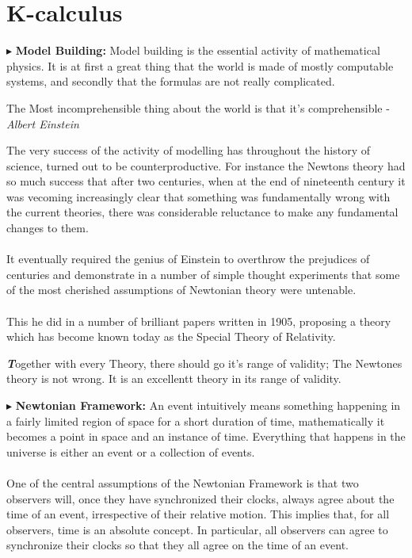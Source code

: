 \documentclass[10pt,a4paper,twocolumn]{article}
\newcounter{theo}
\newenvironment{callout}
	{\begin{calloutbox}\color{charcoal}\textbf\textit}
	{\end{calloutbox}}
\newcommand{\newpoint}[1]{\indent$\blacktriangleright$ \textbf{#1}}
\begin{document}
            \section{K-calculus}
                \newpoint{Model Building:} Model building is the essential activity of mathematical physics. It is at first a great thing that the world is made of mostly computable systems, and secondly that the formulas are not really complicated.
                \begin{qt}
                        The Most incomprehensible thing about the world is that it's comprehensible - \textit{Albert Einstein}
                \end{qt}
                \indent The very success of the activity of modelling has throughout the history of science, turned out to be counterproductive. For instance the Newtons theory had so much success that after two centuries, when at the end of nineteenth century it was vecoming increasingly clear that something was fundamentally wrong with the current theories, there was considerable reluctance to make any fundamental changes to them.
                \\
                \\
                \indent It eventually required the genius of Einstein to overthrow the prejudices of centuries and demonstrate in a number of simple thought experiments that some of the most cherished assumptions of Newtonian theory were untenable.
                \\
                \\
                \indent This he did in a number of brilliant papers written in 1905, proposing a theory which has become known today as the Special Theory of Relativity.
                \begin{callout}
                        Together with every Theory, there should go it's range of validity; The Newtones theory is not wrong. It is an excellentt theory in its range of validity.
                \end{callout}
                \newpoint{Newtonian Framework: } An event intuitively means something happening in a fairly limited region of space for a short duration of time, mathematically it becomes a point in space and an instance of time. Everything that happens in the universe is either an event or a collection of events.
                \\
                \\
                \indent One of the central assumptions of the Newtonian Framework is that two observers will, once they have synchronized their clocks, always agree about the time of an event, irrespective of their relative motion. This implies that, for all observers, time is an absolute concept. In particular, all observers can agree to synchronize their clocks so that they all agree on the time of an event.
\end{document}
